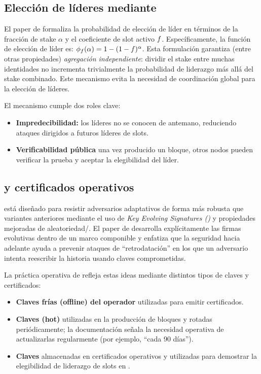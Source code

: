 \subsection{Elección de líderes mediante \VRF}
\label{subsec:motivation-eleccion-de-lideres-mediante-vrf}
El paper de \Praos formaliza la probabilidad de elección de líder en términos de la fracción de stake $\alpha$ y el coeficiente de slot activo $f$. Específicamente, la función de elección de líder es: $\phi_{f}(\alpha) = 1 - (1 - f)^{\alpha}$. Esta formulación garantiza (entre otras propiedades) \emph{agregación independiente}: dividir el stake entre muchas identidades no incrementa trivialmente la probabilidad de liderazgo más allá del stake combinado. Este mecanismo evita la necesidad de coordinación global para la elección de líderes.

El mecanismo \VRF cumple dos roles clave:

\begin{itemize}[noitemsep]
	\item \textbf{Impredecibilidad:} los líderes no se conocen de antemano, reduciendo ataques dirigidos a futuros líderes de slots.
	\item \textbf{Verificabilidad pública} una vez producido un bloque, otros nodos pueden verificar la prueba \VRF y aceptar la elegibilidad del líder.
\end{itemize}

\subsection{\KES y certificados operativos}
\label{subsec:motivation-kes-y-certificados-operativos}

\Praos está diseñado para resistir adversarios adaptativos de forma más robusta que variantes anteriores mediante el uso de \emph{Key Evolving Signatures (\KES)} y propiedades mejoradas de aleatoriedad/\VRF. El paper de \Praos desarrolla explícitamente las firmas evolutivas dentro de un marco componible y enfatiza que la seguridad hacia adelante ayuda a prevenir ataques de ``retrodatación'' en los que un adversario intenta reescribir la historia usando claves comprometidas.

La práctica operativa de \Cardano refleja estas ideas mediante distintos tipos de claves y certificados:

\begin{itemize}
	\item \textbf{Claves frías (offline) del operador} utilizadas para emitir certificados.
	\item \textbf{Claves \KES (hot)} utilizadas en la producción de bloques y rotadas periódicamente; la documentación señala la necesidad operativa de actualizarlas regularmente (por ejemplo, ``cada 90 días'').
	\item \textbf{Claves \VRF} almacenadas en certificados operativos y utilizadas para demostrar la elegibilidad de liderazgo de slots en \Praos.
\end{itemize}

